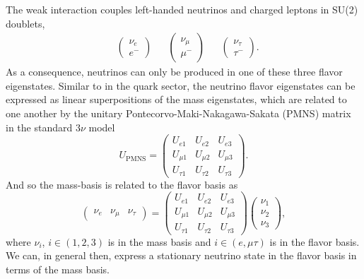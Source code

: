 \documentclass[main.tex]{subfiles}
\begin{document}
The weak interaction couples left-handed neutrinos and charged leptons in SU(2) doublets,
\begin{align}
&\left(\begin{array}{c} \nu_{e} \\ e^{-} \end{array}\right) & &\left(\begin{array}{c} \nu_{\mu} \\ \mu^{-} \end{array}\right) & &\left(\begin{array}{c} \nu_{\tau} \\ \tau^{-} \end{array}\right).
\end{align}
As a consequence, neutrinos can only be produced in one of these three flavor eigenstates.
Similar to in the quark sector, the neutrino flavor eigenstates can be expressed as linear superpositions of the mass eigenstates, which are related to one another by the unitary Pontecorvo-Maki-Nakagawa-Sakata (PMNS) matrix in the standard $3\nu$ model
\begin{equation}
    U_{\text{PMNS}} = \left(\begin{array}{ccc} U_{e1} & U_{e2} & U_{e3} \\ U_{\mu 1} & U_{\mu 2} & U_{\mu 3} \\ U_{\tau 1} & U_{\tau 2} & U_{\tau 3} \end{array}\right).
\end{equation}
And so the mass-basis is related to the flavor basis as
\begin{equation}
    \left(\begin{array}{ccc} \nu_{e} & \nu_{\mu} & \nu_{\tau} \end{array}\right)  = \left(\begin{array}{ccc} U_{e1} & U_{e2} & U_{e3} \\ U_{\mu 1} & U_{\mu 2} & U_{\mu 3} \\ U_{\tau 1} & U_{\tau 2} & U_{\tau 3} \end{array}\right) \left(\begin{array}{c} \nu_{1} \\ \nu_{2} \\ \nu_{3} \end{array}\right),
\end{equation}
where $\nu_{i}$, $i\in\left(1,2,3\right)$ is in the mass basis and $i\in\left(e,\mu\tau\right)$ is in the flavor basis. 
We can, in general then, express a stationary neutrino state in the flavor basis in terms of the mass basis. 
\end{document}
